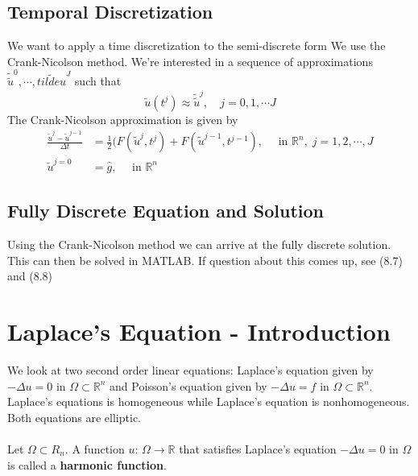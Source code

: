 \documentclass[11pt]{article}
\newcommand{\R}{\mathbb{R}}
\begin{document}
\subsection{Temporal Discretization}
We want to apply a time discretization to the semi-discrete form We use the Crank-Nicolson method. We're interested in a sequence of approximations $\tilde{\tilde{u}}^0, \cdots, \tilde{tilde{u}}^J$ such that
$$ \tilde{u}(t^j) \approx \tilde{\tilde{u}}^j, \quad j=0,1,\cdots J$$
The Crank-Nicolson approximation is given by
\begin{align*}
\frac{\tilde{u}^{j}-\tilde{u}^{j-1}}{\Delta t} &= \frac{1}{2} (F(\tilde{u}^j, t^j) + F(\tilde{u}^{j-1}, t^{j-1}), \quad \text{ in } \R^n, \; j =1,2,\cdots, J\\
\tilde{u}^{j=0} &= \hat{g}, \quad \text{ in } \R^n
\end{align*}

\subsection{Fully Discrete Equation and Solution}
Using the Crank-Nicolson method we can arrive at the fully discrete solution. This can then be solved in MATLAB. If question about this comes up, see (8.7) and (8.8)

\pagebreak

\section{Laplace's Equation - Introduction}
We look at two second order linear equations:  Laplace's equation given by $-\Delta u = 0$ in $\Omega \subset \R^n$ and Poisson's equation given by $-\Delta u = f$ in $\Omega \subset \R^n$. Laplace's equations is homogeneous while Laplace's equation is nonhomogeneous. Both equations are elliptic. \\ \\ 
Let $\Omega \subset R_n$.  A function $u$: $\Omega \rightarrow \R$ that satisfies Laplace’s equation $-\Delta u = 0$ in $\Omega$ is called a \textbf{harmonic function}.
\end{document}

